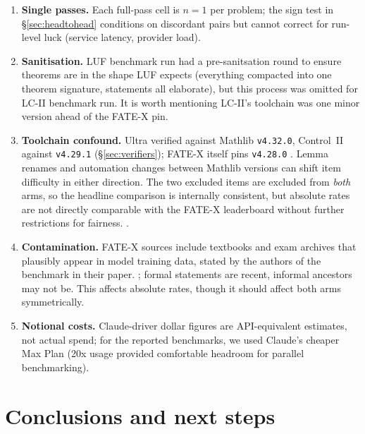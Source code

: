 \documentclass[12pt, a4paper]{article}
\begin{document}
\begin{enumerate}[itemsep=2pt]
\item \textbf{Single passes.} Each full-pass cell is $n{=}1$ per problem; the
      sign test in \S\ref{sec:headtohead} conditions on discordant pairs but
      cannot correct for run-level luck (service latency, provider load).
\item \textbf{Sanitisation.} LUF benchmark run had a pre-sanitsation round to ensure 
      theorems are in the shape LUF expects (everything compacted into one theorem signature,
      statements all elaborate), but this process was omitted for LC-II benchmark run.
      It is worth mentioning LC-II's toolchain was one minor version ahead of
      the FATE-X pin. 
\item \textbf{Toolchain confound.} Ultra verified against Mathlib
      \texttt{v4.32.0}, Control~II against \texttt{v4.29.1}
      (\S\ref{sec:verifiers}); FATE-X itself pins \texttt{v4.28.0}
      \cite{fatex2025}. Lemma renames and automation changes between Mathlib
      versions can shift item difficulty in either direction. The two
      excluded items are excluded from \emph{both} arms, so the headline
      comparison is internally consistent, but absolute rates are not
      directly comparable with the FATE-X leaderboard without further
      restrictions for fairness.
      \cite{benchmarklist_fatex}.
\item \textbf{Contamination.} FATE-X sources include textbooks and exam
      archives that plausibly appear in model training data, stated by
      the authors of the benchmark in their paper.
      \cite{anthropic2026sonnet5}; formal statements are recent, informal
      ancestors may not be. This affects absolute rates, though it should
      affect both arms symmetrically.
\item \textbf{Notional costs.} Claude-driver dollar figures are
      API-equivalent estimates, not actual spend; for the reported benchmarks,
      we used Claude's cheaper Max Plan (20x usage provided comfortable headroom for 
      parallel benchmarking).
\end{enumerate}

\section{Conclusions and next steps}
\label{sec:nextsteps}
\end{document}
